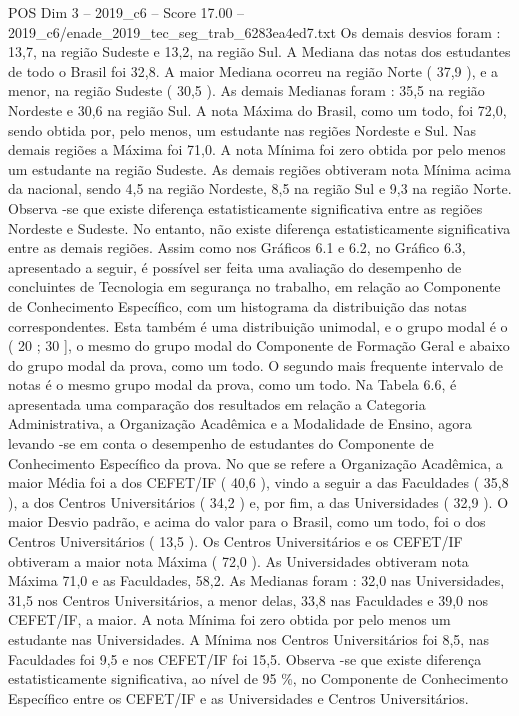 \begin{textsample}{POS Dim 3 – 2019\_c6 – Score 17.00 – 2019\_c6/enade\_2019\_tec\_seg\_trab\_6283ea4ed7.txt}
Os demais desvios foram : 13,7, na região Sudeste e 13,2, na região Sul.
A Mediana das notas dos estudantes de todo o Brasil foi 32,8.
A maior Mediana ocorreu na região Norte ( 37,9 ), e a menor, na região Sudeste ( 30,5 ).
As demais Medianas foram : 35,5 na região Nordeste e 30,6 na região Sul.
A nota Máxima do Brasil, como um todo, foi 72,0, sendo obtida por, pelo menos, um estudante nas regiões Nordeste e Sul.
Nas demais regiões a Máxima foi 71,0.
A nota Mínima foi zero obtida por pelo menos um estudante na região Sudeste.
As demais regiões obtiveram nota Mínima acima da nacional, sendo 4,5 na região Nordeste, 8,5 na região Sul e 9,3 na região Norte.
Observa -se que existe diferença estatisticamente significativa entre as regiões Nordeste e Sudeste.
No entanto, não existe diferença estatisticamente significativa entre as demais regiões.
Assim como nos Gráficos 6.1 e 6.2, no Gráfico 6.3, apresentado a seguir, é possível ser feita uma avaliação do desempenho de concluintes de Tecnologia em segurança no trabalho, em relação ao Componente de Conhecimento Específico, com um histograma da distribuição das notas correspondentes.
Esta também é uma distribuição unimodal, e o grupo modal é o ( 20 ; 30 ], o mesmo do grupo modal do Componente de Formação Geral e abaixo do grupo modal da prova, como um todo.
O segundo mais frequente intervalo de notas é o mesmo grupo modal da prova, como um todo.
Na Tabela 6.6, é apresentada uma comparação dos resultados em relação a Categoria Administrativa, a Organização Acadêmica e a Modalidade de Ensino, agora levando -se em conta o desempenho de estudantes do Componente de Conhecimento Específico da prova.
No que se refere a Organização Acadêmica, a maior Média foi a dos CEFET/IF ( 40,6 ), vindo a seguir a das Faculdades ( 35,8 ), a dos Centros Universitários ( 34,2 ) e, por fim, a das Universidades ( 32,9 ).
O maior Desvio padrão, e acima do valor para o Brasil, como um todo, foi o dos Centros Universitários ( 13,5 ).
Os Centros Universitários e os CEFET/IF obtiveram a maior nota Máxima ( 72,0 ).
As Universidades obtiveram nota Máxima 71,0 e as Faculdades, 58,2.
As Medianas foram : 32,0 nas Universidades, 31,5 nos Centros Universitários, a menor delas, 33,8 nas Faculdades e 39,0 nos CEFET/IF, a maior.
A nota Mínima foi zero obtida por pelo menos um estudante nas Universidades.
A Mínima nos Centros Universitários foi 8,5, nas Faculdades foi 9,5 e nos CEFET/IF foi 15,5.
Observa -se que existe diferença estatisticamente significativa, ao nível de 95 \%, no Componente de Conhecimento Específico entre os CEFET/IF e as Universidades e Centros Universitários.

\end{textsample}
